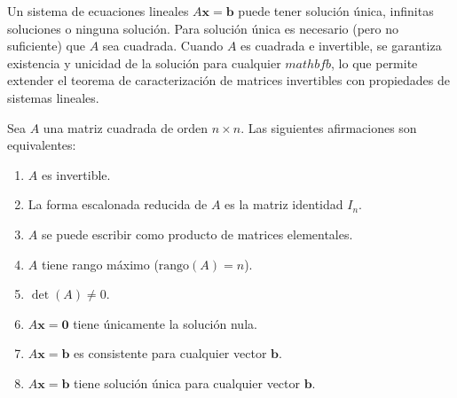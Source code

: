 \begin{rem} 
Un sistema de ecuaciones lineales $A\mathbf{x}=\mathbf{b}$ puede tener solución única, infinitas soluciones o ninguna solución. Para solución única es necesario (pero no suficiente) que $A$ sea cuadrada. Cuando $A$ es cuadrada e invertible, se garantiza existencia y unicidad de la solución para cualquier $mathbf{b}$, lo que permite extender el teorema de caracterización de matrices invertibles con propiedades de sistemas lineales.
\end{rem}

\begin{theorem}\label{thm:invertible-equiv-v3}
Sea $A$ una matriz cuadrada de orden $n \times n$. Las siguientes afirmaciones son equivalentes:
\begin{enumerate}
    \item $A$ es invertible.
    \item La forma escalonada reducida de $A$ es la matriz identidad $I_n$.
    \item $A$ se puede escribir como producto de matrices elementales.
    \item $A$ tiene rango máximo ($\text{rango}(A) = n$).
    \item $\det(A) \neq 0$.
    \item $A\mathbf{x}=\mathbf{0}$ tiene únicamente la solución nula.
    \item $A\mathbf{x}=\mathbf{b}$ es consistente para cualquier vector $\mathbf{b}$.
    \item $A\mathbf{x}=\mathbf{b}$ tiene solución única para cualquier vector $\mathbf{b}$.
\end{enumerate}
\end{theorem}


